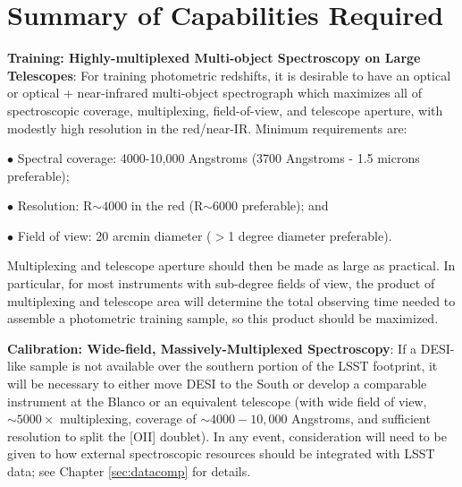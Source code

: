%



\section{Summary of Capabilities Required}

{\bf Training: Highly-multiplexed Multi-object Spectroscopy on Large Telescopes}: For training photometric redshifts, it is desirable to have an optical or optical + near-infrared multi-object spectrograph which maximizes all of spectroscopic coverage, multiplexing, field-of-view, and telescope aperture, with modestly high resolution in the red/near-IR.  Minimum requirements are:

$\bullet$ Spectral coverage: 4000-10,000 Angstroms (3700 Angstroms - 1.5 microns preferable);

$\bullet$ Resolution: R$\sim 4000$ in the red (R$\sim 6000$ preferable); and

$\bullet$ Field of view: 20 arcmin diameter ($>$1 degree diameter preferable).

Multiplexing and telescope aperture should then be made as large as practical.  In particular, for most instruments with sub-degree fields of view, the product of multiplexing and telescope area will determine the total observing time needed to assemble a photometric training sample, so this product should be maximized.  

{\bf Calibration: Wide-field, Massively-Multiplexed Spectroscopy}: If a DESI-like sample is not available over the southern portion of the LSST footprint, it will be necessary to either move DESI to the South or develop a comparable instrument at the Blanco or an equivalent telescope (with wide field of view, $\sim 5000\times$ multiplexing, coverage of $\sim 4000-10,000$ Angstroms, and sufficient resolution to split the [OII] doublet).  In any event, consideration will need to be given to how external spectroscopic resources should be integrated with LSST data; see Chapter \ref{sec:datacomp} for details.


